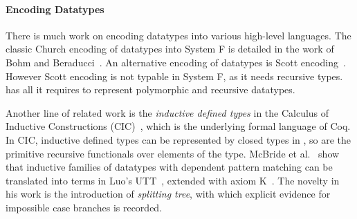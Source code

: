 \paragraph{Encoding Datatypes}
There is much work on encoding datatypes into various high-level
languages. The classic Church encoding of datatypes into System F is
detailed in the work of Bohm and Beraducci~\cite{Bohm1985}.  An
alternative encoding of datatypes is Scott
encoding~\cite{encoding:scott}. However Scott encoding is not typable
in System F, as it needs recursive types. \name has all it requires to
represent polymorphic and recursive datatypes.

Another line of related work is the \emph{inductive defined types} in
the Calculus of Inductive Constructions (CIC)~\cite{cic}, which is the
underlying formal language of Coq. In CIC, inductive defined types can
be represented by closed types in \coc, so are the primitive recursive
functionals over elements of the type. McBride et
al.~\cite{elim:pi:pattern} show that inductive families of datatypes
with dependent pattern matching can be translated into terms in Luo's
UTT~\cite{Luo:UTT}, extended with axiom K~\cite{axiomK}. The novelty
in his work is the introduction of \emph{splitting tree}, with which
explicit evidence for impossible case branches is recorded.
